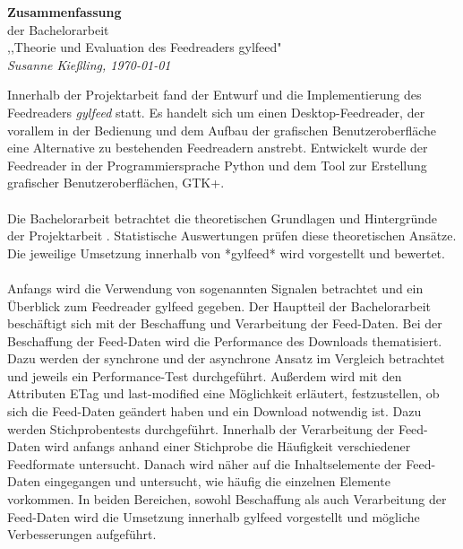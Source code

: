\documentclass{scrartcl}
\begin{document}
\begin{center}
    \LARGE \textbf{Zusammenfassung} \\
    \vspace{.1in}
    \large der Bachelorarbeit \\
    \vspace{.1in}
    \small ,,Theorie und Evaluation des Feedreaders gylfeed" \\
    \vspace{.1in}
    \small \textit{Susanne Kießling, \today}
    \vspace{.2in}
\end{center}


Innerhalb der Projektarbeit \cite{kiessling} fand der Entwurf und die
Implementierung des Feedreaders \textit{\textit{\textit{}}gylfeed} statt. Es handelt sich um einen
Desktop-Feedreader, der vorallem in der Bedienung und dem Aufbau der grafischen
Benutzeroberfläche eine Alternative zu bestehenden Feedreadern anstrebt.
Entwickelt wurde der Feedreader in der Programmiersprache Python und dem Tool
zur Erstellung grafischer Benutzeroberflächen, GTK+.
\\
\\
Die Bachelorarbeit betrachtet die theoretischen Grundlagen und Hintergründe 
der Projektarbeit \cite{kiessling}. Statistische Auswertungen prüfen diese 
theoretischen Ansätze. Die jeweilige Umsetzung innerhalb von *gylfeed* 
wird vorgestellt und bewertet.
\\
\\
Anfangs wird die Verwendung von sogenannten Signalen betrachtet und ein
Überblick zum Feedreader gylfeed gegeben. Der Hauptteil der Bachelorarbeit
beschäftigt sich mit der Beschaffung und Verarbeitung der Feed-Daten. Bei der
Beschaffung der Feed-Daten wird die Performance des Downloads thematisiert. Dazu
werden der synchrone und der asynchrone Ansatz im Vergleich betrachtet und jeweils
ein Performance-Test durchgeführt. Außerdem wird mit den Attributen ETag und
last-modified eine Möglichkeit erläutert, festzustellen, ob sich die Feed-Daten
geändert haben und ein Download notwendig ist. Dazu werden Stichprobentests
durchgeführt. Innerhalb der Verarbeitung der Feed-Daten wird anfangs anhand einer
Stichprobe die Häufigkeit verschiedener Feedformate untersucht. Danach wird
näher auf die Inhaltselemente der Feed-Daten eingegangen und untersucht, wie
häufig die einzelnen Elemente vorkommen. In beiden Bereichen, sowohl Beschaffung
als auch Verarbeitung der Feed-Daten wird die Umsetzung innerhalb gylfeed
vorgestellt und mögliche Verbesserungen aufgeführt.
\end{document}
